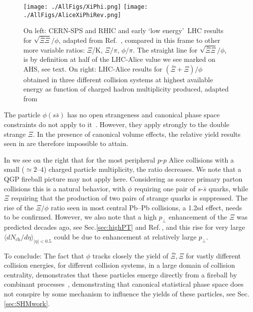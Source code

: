 \begin{figure}[tb]\sidecaption
\centerline{%
\texttt{[image: ./AllFigs/XiPhi.png]}
\texttt{[image: ./AllFigs/AliceXiPhiRev.png]}
}
\caption{%
On left: CERN-SPS and RHIC and early \lq low energy\rq\ LHC results for $\sqrt{\overline{ \Xi} \Xi}/\phi$, adapted from Ref.~\cite{Petran:2009dc}, compared in this frame to other more variable ratios: $\Xi$/K, $\Xi/\pi$, $\phi/\pi$. The straight line for $\sqrt{\bar \Xi \Xi}/\phi$, is by definition at half of the LHC-Alice value we see marked on AHS, see text. On right: LHC-Alice results for $(\bar\Xi+\Xi)/\phi$ obtained in three different collision systems at highest available energy as function of charged hadron multiplicity produced, adapted from~\cite{Tripathy:2018ehz,Tripathy:2019flj}
}
\label{fig:Xiphi}
\end{figure}
 


The particle $\phi(s\bar s)$ has no open strangeness and canonical phase space constraints do not apply to it~\cite{Rafelski:1980gk,Rafelski:2001bu}. However, they apply strongly to the double strange $\Xi$. In the presence of canonical volume effects, the relative yield results seen in  are therefore impossible to attain.

In  we see on the right that for the most peripheral $p$-$p$ Alice collisions with a small ($\simeq 2$--$4$) charged particle multiplicity, the ratio decreases. We note that a QGP fireball picture may not apply here. Considering as source primary parton collisions this is a natural behavior, with $\phi$ requiring one pair of $s$-$\bar s$ quarks, while $\Xi$ requiring that the production of two pairs of strange quarks is suppressed. The rise of the $\Xi/\phi$ ratio seen in most central Pb--Pb collisions, a 1.2sd effect, needs to be confirmed. However, we also note that a high $p_\bot$ enhancement of the $\Xi$ was predicted decades ago, see Sec.\ref{sec:highPT} and Ref.\,\cite{Rafelski:1987un}, and this rise for very large $\langle dN_\mathrm{ch}/d\eta\rangle_{|\eta|<0.5}$ could be due to enhancement at relatively large $p_\bot$.

{To conclude:} The fact that $\phi$ tracks closely the yield of $\bar \Xi, \Xi$ for vastly different collision energies, for different collision systems, in a large domain of collision centrality, demonstrates that these particles emerge directly from a fireball by combinant processes~\cite{Koch:1986ud,Rafelski:1987un}, demonstrating that canonical statistical phase space does not conspire by some mechanism to influence the yields of these particles, see Sec.\ref{sec:SHMwork}.



